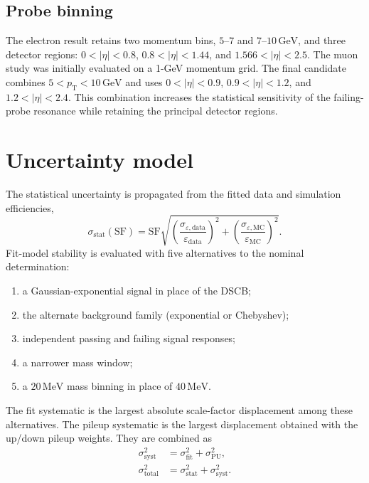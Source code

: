 \documentclass[11pt,a4paper]{article}
\newcommand{\pt}{p_{\mathrm{T}}}
\newcommand{\abseta}{|\eta|}
\newcommand{\eff}{\varepsilon}
\newcommand{\SF}{\mathrm{SF}}
\begin{document}
\subsection{Probe binning}

The electron result retains two momentum bins, $5$--$7$ and $7$--$10\,\mathrm{GeV}$, and three detector regions: $0<\abseta<0.8$, $0.8<\abseta<1.44$, and $1.566<\abseta<2.5$.  The muon study was initially evaluated on a 1-GeV momentum grid.  The final candidate combines $5<\pt<10\,\mathrm{GeV}$ and uses $0<\abseta<0.9$, $0.9<\abseta<1.2$, and $1.2<\abseta<2.4$.  This combination increases the statistical sensitivity of the failing-probe resonance while retaining the principal detector regions.

\section{Uncertainty model}

The statistical uncertainty is propagated from the fitted data and simulation efficiencies,
\begin{equation}
  \sigma_{\mathrm{stat}}(\SF)=\SF
  \sqrt{\left(\frac{\sigma_{\eff,\mathrm{data}}}{\eff_{\mathrm{data}}}\right)^2
  +\left(\frac{\sigma_{\eff,\mathrm{MC}}}{\eff_{\mathrm{MC}}}\right)^2}.
\end{equation}
Fit-model stability is evaluated with five alternatives to the nominal determination:
\begin{enumerate}[leftmargin=7mm,itemsep=1mm]
  \item a Gaussian-exponential signal in place of the DSCB;
  \item the alternate background family (exponential or Chebyshev);
  \item independent passing and failing signal responses;
  \item a narrower mass window;
  \item a $20\,\mathrm{MeV}$ mass binning in place of $40\,\mathrm{MeV}$.
\end{enumerate}
The fit systematic is the largest absolute scale-factor displacement among these alternatives.  The pileup systematic is the largest displacement obtained with the up/down pileup weights.  They are combined as
\begin{align}
  \sigma_{\mathrm{syst}}^2 &= \sigma_{\mathrm{fit}}^2+\sigma_{\mathrm{PU}}^2,\\
  \sigma_{\mathrm{total}}^2 &= \sigma_{\mathrm{stat}}^2+\sigma_{\mathrm{syst}}^2.
\end{align}
\end{document}

